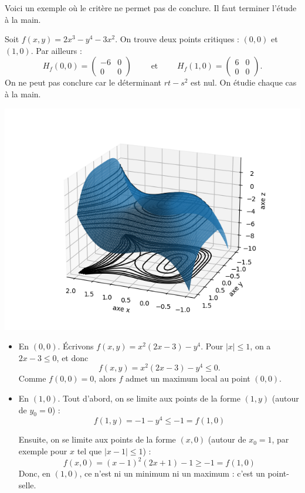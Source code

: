 \documentclass[11pt, class=report,crop=false]{standalone}
\begin{document}
Voici un exemple où le critère ne permet pas de conclure. Il faut terminer l'étude à la main.
\begin{exemple}
Soit $f(x,y)=2x^3-y^4-3x^2$. On trouve deux points critiques : $(0,0)$ et $(1,0)$. Par ailleurs :
$$H_f(0,0)=\begin{pmatrix}-6&0\\ 0&0\end{pmatrix}\qquad \text{ et } \qquad H_f(1,0)=\begin{pmatrix}6&0\\ 0&0\end{pmatrix}.$$
On ne peut pas conclure car le déterminant $rt-s^2$ est nul. On étudie chaque cas à la main.


\begin{center}
\includegraphics[scale=\myscale,scale=0.8]{figures/fonctions-extrem-5}
\end{center}


\begin{itemize}
	\item En $(0,0)$. 
	Écrivons $f(x,y)=x^2(2x-3)-y^4$.
	Pour $|x|\le 1$, on a $2x-3 \le0$, et donc 
	$$f(x,y)=x^2(2x-3)-y^4 \le 0.$$
	Comme $f(0,0)=0$, alors $f$ admet un maximum local au point $(0,0)$.
	
	\item  En $(1,0)$. 
	Tout d'abord, on se limite aux points de la forme $(1,y)$ (autour de $y_0=0$) :
		$$f(1,y)=-1-y^4\le -1 = f(1,0)$$
		
	Ensuite, on se limite aux points de la forme $(x,0)$ (autour de $x_0=1$, par exemple pour $x$ tel que  $|x-1|\leq 1$) : 
	$$ f(x,0)=(x-1)^2(2x+1)-1 \ge -1 = f(1,0)$$
	Donc, en $(1,0)$, ce n'est ni un minimum ni un maximum : c'est un point-selle.
	
\end{itemize}

\end{exemple}
\end{document}
